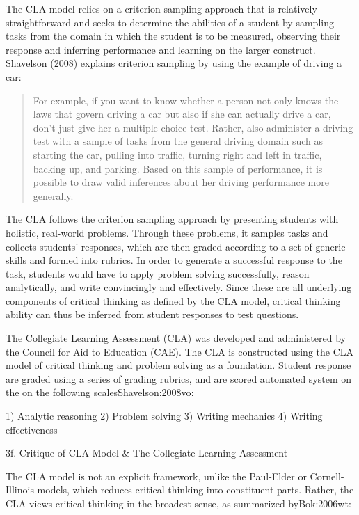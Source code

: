 The CLA model relies on a criterion sampling approach that is relatively straightforward and seeks to determine the abilities of a student by sampling tasks from the domain in which the student is to be measured, observing their response and inferring performance and learning on the larger construct. Shavelson (2008) explains criterion sampling by using the example of driving a car:

\begin{quote}
For example, if you want to know whether a person not only knows the laws that govern driving a car but also if she can actually drive a car, don’t just give her a multiple-choice test. Rather, also administer a driving test with a sample of tasks from the general driving domain such as starting the car, pulling into traffic, turning right and left in traffic, backing up, and parking. Based on this sample of performance, it is possible to draw valid inferences about her driving performance more generally. 
\end{quote}

The CLA follows the criterion sampling approach by presenting students with holistic, real-world problems. Through these problems, it samples tasks and collects students’ responses, which are then graded according to a set of generic skills and formed into rubrics. In order to generate a successful response to the task, students would have to apply problem solving successfully, reason analytically, and write convincingly and effectively. Since these are all underlying components of critical thinking as defined by the CLA model, critical thinking ability can thus be inferred from student responses to test questions.

The Collegiate Learning Assessment (CLA) was developed and administered by the Council for Aid to Education (CAE).  The CLA is constructed using the CLA model of critical thinking and problem solving as a foundation. Student response are graded using a series of grading rubrics, and are scored automated system on the on the following scales{Shavelson:2008vo}:

1)	Analytic reasoning
2)	Problem solving
3)	Writing mechanics
4)	Writing effectiveness

3f. Critique of CLA Model & The Collegiate Learning Assessment

The CLA model is not an explicit framework, unlike the Paul-Elder or Cornell-Illinois models, which reduces critical thinking into constituent parts. Rather, the CLA views critical thinking in the broadest sense, as summarized by{Bok:2006wt}:

